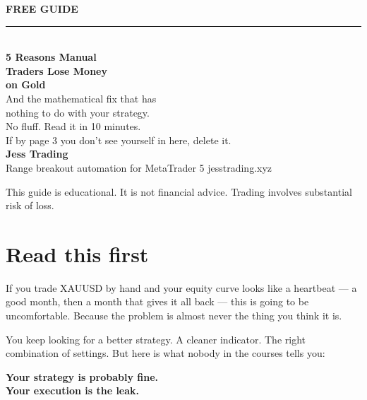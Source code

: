 \documentclass[11pt]{article}
\begin{document}
\thispagestyle{empty}
\vspace*{2.2cm}

{\color{neon}\bfseries\large FREE GUIDE}\\[0.3cm]
{\color{neon}\rule{2.2cm}{2pt}}\\[1.0cm]

{\color{ink}\fontsize{30}{34}\selectfont\bfseries 5 Reasons Manual\\[2pt] Traders Lose Money\\[2pt] on Gold}\\[0.8cm]

{\color{inksec}\Large And the mathematical fix that has\\ nothing to do with your strategy.}\\[2.2cm]

{\color{inkmuted}\normalsize No fluff. Read it in 10 minutes.\\ If by page 3 you don't see yourself in here, delete it.}\\[3cm]

{\color{ink}\bfseries\large Jess Trading}\\
{\color{inkmuted}Range breakout automation for MetaTrader 5 \quad\textbar\quad jesstrading.xyz}

\vfill
{\color{inkmuted}\footnotesize This guide is educational. It is not financial advice. Trading involves substantial risk of loss.}

\newpage

\section{Read this first}

If you trade XAUUSD by hand and your equity curve looks like a heartbeat --- a good month, then a month that gives it all back --- this is going to be uncomfortable. Because the problem is almost never the thing you think it is.

You keep looking for a better strategy. A cleaner indicator. The right combination of settings. But here is what nobody in the courses tells you:

\vspace{0.5ex}
\begin{center}
{\color{ink}\Large\bfseries Your strategy is probably fine.\\[2pt] {\color{neon}Your execution is the leak.}}
\end{center}
\vspace{0.5ex}
\end{document}
